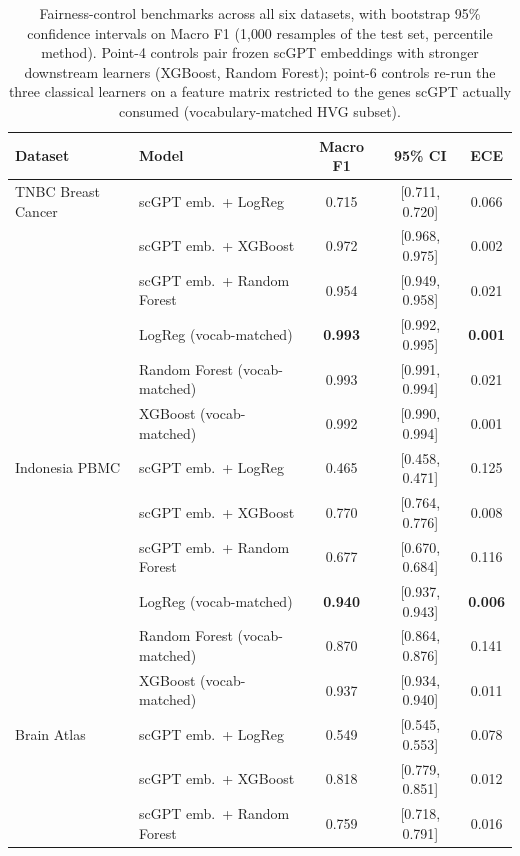 \documentclass[11pt,a4paper]{article}
\newcommand{\multirow}[3]{#3}
\begin{document}
\begin{table}[H]
\centering
\caption{Fairness-control benchmarks across all six datasets, with bootstrap 95\% confidence intervals on Macro F1 (1{,}000 resamples of the test set, percentile method). Point-4 controls pair frozen scGPT embeddings with stronger downstream learners (XGBoost, Random Forest); point-6 controls re-run the three classical learners on a feature matrix restricted to the genes scGPT actually consumed (vocabulary-matched HVG subset).}
\label{tab:fairness}
\setlength{\tabcolsep}{4pt}
\footnotesize
\begin{tabular}{llccc}
\toprule
\textbf{Dataset} & \textbf{Model} & \textbf{Macro F1} & \textbf{95\% CI} & \textbf{ECE} \\
\midrule
\multirow{6}{*}{TNBC Breast Cancer}
 & scGPT emb.\ + LogReg                & 0.715 & [0.711, 0.720] & 0.066 \\
 & scGPT emb.\ + XGBoost               & 0.972 & [0.968, 0.975] & 0.002 \\
 & scGPT emb.\ + Random Forest         & 0.954 & [0.949, 0.958] & 0.021 \\
 & LogReg (vocab-matched)              & \textbf{0.993} & [0.992, 0.995] & \textbf{0.001} \\
 & Random Forest (vocab-matched)       & 0.993 & [0.991, 0.994] & 0.021 \\
 & XGBoost (vocab-matched)             & 0.992 & [0.990, 0.994] & 0.001 \\
\midrule
\multirow{6}{*}{Indonesia PBMC}
 & scGPT emb.\ + LogReg                & 0.465 & [0.458, 0.471] & 0.125 \\
 & scGPT emb.\ + XGBoost               & 0.770 & [0.764, 0.776] & 0.008 \\
 & scGPT emb.\ + Random Forest         & 0.677 & [0.670, 0.684] & 0.116 \\
 & LogReg (vocab-matched)              & \textbf{0.940} & [0.937, 0.943] & \textbf{0.006} \\
 & Random Forest (vocab-matched)       & 0.870 & [0.864, 0.876] & 0.141 \\
 & XGBoost (vocab-matched)             & 0.937 & [0.934, 0.940] & 0.011 \\
\midrule
\multirow{6}{*}{Brain Atlas}
 & scGPT emb.\ + LogReg                & 0.549 & [0.545, 0.553] & 0.078 \\
 & scGPT emb.\ + XGBoost               & 0.818 & [0.779, 0.851] & 0.012 \\
 & scGPT emb.\ + Random Forest         & 0.759 & [0.718, 0.791] & 0.016 \\

\end{tabular}
\end{table}
\end{document}
